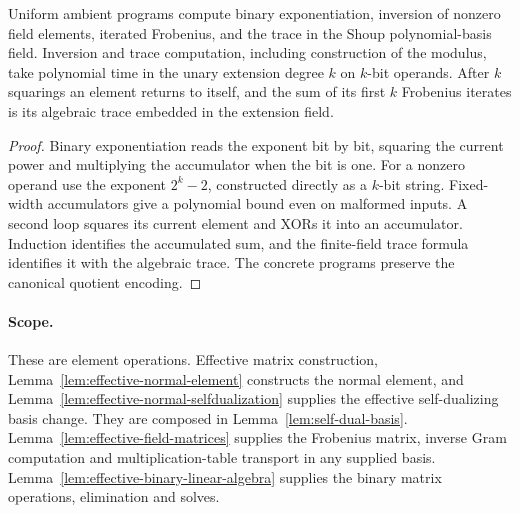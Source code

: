 \begin{lemma}
\label{lem:effective-field-inverse-trace}
\leanok
Uniform ambient programs compute binary exponentiation, inversion of nonzero
field elements, iterated Frobenius, and the trace in the Shoup polynomial-basis
field. Inversion and trace computation, including construction of the modulus,
take polynomial time in the unary extension degree $k$ on $k$-bit operands.
After $k$ squarings an element returns to itself, and the sum of its first $k$
Frobenius iterates is its algebraic trace embedded in the extension field.
\end{lemma}
\begin{proof}
\leanok
Binary exponentiation reads the exponent bit by bit, squaring the current power
and multiplying the accumulator when the bit is one. For a nonzero operand use
the exponent $2^k-2$, constructed directly as a $k$-bit string. Fixed-width
accumulators give a polynomial bound even on malformed inputs. A second loop
squares its current element and XORs it into an accumulator. Induction identifies
the accumulated sum, and the finite-field trace formula identifies it with the
algebraic trace. The concrete programs preserve the canonical quotient encoding.
\end{proof}
\paragraph{Scope.} These are element operations. Effective matrix construction,
Lemma~\ref{lem:effective-normal-element} constructs the normal element, and
Lemma~\ref{lem:effective-normal-selfdualization} supplies the effective self-dualizing
basis change. They are composed in Lemma~\ref{lem:self-dual-basis}. Lemma~\ref{lem:effective-field-matrices} supplies the Frobenius matrix,
inverse Gram computation and multiplication-table transport in any supplied basis. Lemma~\ref{lem:effective-binary-linear-algebra}
supplies the binary matrix operations, elimination and solves.

